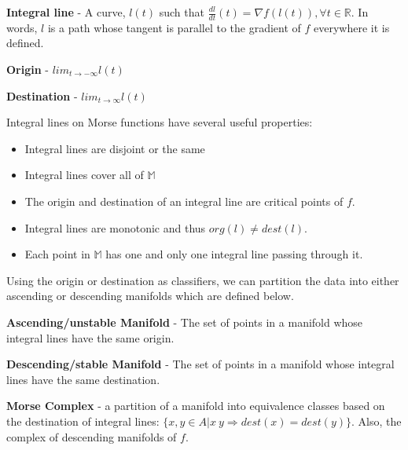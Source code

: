 \begin{defn}
  \textbf{Integral line} - A curve, $l(t)$ such that $\frac{d l}{d t}(t) = \nabla f(l(t)), \forall t \in \mathbb{R}$. In words, $l$ is a path whose tangent is parallel to the gradient of $f$ everywhere it is defined.
\end{defn}

\begin{defn}
  \textbf{Origin} - $lim_{t\rightarrow -\infty}l(t)$
\end{defn}

\begin{defn}
  \textbf{Destination} - $lim_{t\rightarrow \infty}l(t)$
\end{defn}

Integral lines on Morse functions have several useful properties:

\begin{itemize}
\item Integral lines are disjoint or the same
\item Integral lines cover all of $\mathbb{M}$
\item The origin and destination of an integral line are critical points of $f$.
\item Integral lines are monotonic and thus $org(l) \neq dest(l)$.
\item Each point in $\mathbb{M}$ has one and only one integral line passing through it.
\end{itemize}

Using the origin or destination as classifiers, we can partition the data into either ascending or descending manifolds which are defined below.

\begin{defn}
  \textbf{Ascending/unstable Manifold} - The set of points in a manifold whose integral lines have the same origin.
\end{defn}

\begin{defn}
  \textbf{Descending/stable Manifold} - The set of points in a manifold whose integral lines have the same destination.
\end{defn}


\begin{defn}
 \textbf{Morse Complex} - a partition of a manifold into equivalence classes based on the destination of integral lines: $\{x,y \in A | x~y \Rightarrow dest(x) = dest(y)\}$. Also, the complex of descending manifolds of $f$.
\end{defn}

